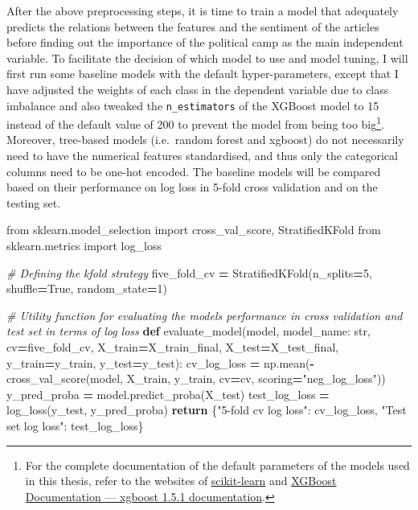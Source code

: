 \documentclass[a4paper, oneside]{report}
\newenvironment{Shaded}{\begin{snugshade}}{\end{snugshade}}
\newcommand{\BuiltInTok}[1]{#1}
\newcommand{\CommentTok}[1]{\textcolor[rgb]{0.56,0.35,0.01}{\textit{#1}}}
\newcommand{\ControlFlowTok}[1]{\textcolor[rgb]{0.13,0.29,0.53}{\textbf{#1}}}
\newcommand{\DecValTok}[1]{\textcolor[rgb]{0.00,0.00,0.81}{#1}}
\newcommand{\ImportTok}[1]{#1}
\newcommand{\KeywordTok}[1]{\textcolor[rgb]{0.13,0.29,0.53}{\textbf{#1}}}
\newcommand{\NormalTok}[1]{#1}
\newcommand{\OperatorTok}[1]{\textcolor[rgb]{0.81,0.36,0.00}{\textbf{#1}}}
\newcommand{\StringTok}[1]{\textcolor[rgb]{0.31,0.60,0.02}{#1}}
\newcommand{\VariableTok}[1]{\textcolor[rgb]{0.00,0.00,0.00}{#1}}
\renewenvironment{Shaded}
{
  \vspace{4pt}%
  \begin{snugshade}%
}{%
  \end{snugshade}%
  \vspace{4pt}%
}
\begin{document}
After the above preprocessing steps, it is time to train a model that
adequately predicts the relations between the features and the sentiment
of the articles before finding out the importance of the political camp
as the main independent variable. To facilitate the decision of which
model to use and model tuning, I will first run some baseline models
with the default hyper-parameters, except that I have adjusted the
weights of each class in the dependent variable due to class imbalance
and also tweaked the \texttt{n\_estimators} of the XGBoost model to 15
instead of the default value of 200 to prevent the model from being too
big\footnote{For the complete documentation of the default parameters of
  the models used in this thesis, refer to the websites of
  \href{scikit-learn:\%20machine\%20learning\%20in\%20Python\%20—\%20scikit-learn\%201.0.2\%20documentation}{scikit-learn}
  and \href{https://xgboost.readthedocs.io/en/stable/}{XGBoost
  Documentation --- xgboost 1.5.1 documentation}.}. Moreover, tree-based
models (i.e.~random forest and xgboost) do not necessarily need to have
the numerical features standardised, and thus only the categorical
columns need to be one-hot encoded. The baseline models will be compared
based on their performance on log loss in 5-fold cross validation and on
the testing set.

\begin{Shaded}
\begin{Highlighting}[]
\ImportTok{from}\NormalTok{ sklearn.model\_selection }\ImportTok{import}\NormalTok{ cross\_val\_score, StratifiedKFold}
\ImportTok{from}\NormalTok{ sklearn.metrics }\ImportTok{import}\NormalTok{ log\_loss}

\CommentTok{\# Defining the kfold strategy}
\NormalTok{five\_fold\_cv }\OperatorTok{=}\NormalTok{ StratifiedKFold(n\_splits}\OperatorTok{=}\DecValTok{5}\NormalTok{, shuffle}\OperatorTok{=}\VariableTok{True}\NormalTok{, random\_state}\OperatorTok{=}\DecValTok{1}\NormalTok{)}

\CommentTok{\# Utility function for evaluating the model\textquotesingle{}s performance in cross validation and test set in terms of log loss}
\KeywordTok{def}\NormalTok{ evaluate\_model(model, model\_name: }\BuiltInTok{str}\NormalTok{, cv}\OperatorTok{=}\NormalTok{five\_fold\_cv, X\_train}\OperatorTok{=}\NormalTok{X\_train\_final, X\_test}\OperatorTok{=}\NormalTok{X\_test\_final, y\_train}\OperatorTok{=}\NormalTok{y\_train, y\_test}\OperatorTok{=}\NormalTok{y\_test):}
\NormalTok{  cv\_log\_loss }\OperatorTok{=}\NormalTok{ np.mean(}\OperatorTok{{-}}\NormalTok{cross\_val\_score(model, X\_train, y\_train, cv}\OperatorTok{=}\NormalTok{cv, scoring}\OperatorTok{=}\StringTok{"neg\_log\_loss"}\NormalTok{))}
\NormalTok{  y\_pred\_proba }\OperatorTok{=}\NormalTok{ model.predict\_proba(X\_test)}
\NormalTok{  test\_log\_loss }\OperatorTok{=}\NormalTok{ log\_loss(y\_test, y\_pred\_proba)}
  \ControlFlowTok{return}\NormalTok{ \{}\StringTok{"5{-}fold cv log loss"}\NormalTok{: cv\_log\_loss, }\StringTok{"Test set log loss"}\NormalTok{: test\_log\_loss\}}
  
\end{Highlighting}
\end{Shaded}
\end{document}
